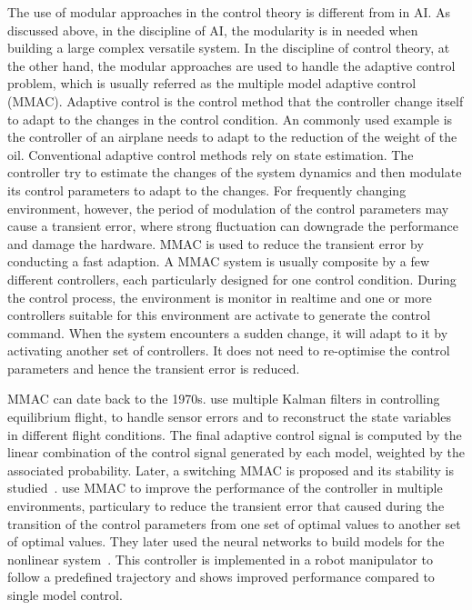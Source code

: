 The use of modular approaches in the control theory is different from in AI. As discussed above, in the discipline of AI, the modularity is in needed when building a large complex versatile system. In the discipline of control theory, at the other hand, the modular approaches are used to handle the adaptive control problem, which is usually referred as the multiple model adaptive control (MMAC).
Adaptive control is the control method that the controller change itself to adapt to the changes in the control condition.
An commonly used example is the controller of an airplane needs to adapt to the reduction of the weight of the oil.
Conventional adaptive control methods rely on state estimation. The controller try to estimate the changes of the system dynamics and then modulate its control parameters to adapt to the changes. For frequently changing environment, however, the period of modulation of the control parameters may cause a transient error, where strong fluctuation can downgrade the performance and damage the hardware. MMAC is used to reduce the transient error by conducting a fast adaption. A MMAC system is usually composite by a few different controllers, each particularly designed for one control condition. During the control process, the environment is monitor in realtime and one or more controllers suitable for this environment are activate to generate the control command. When the system encounters a sudden change, it will adapt to it by activating another set of controllers. It does not need to re-optimise the control parameters and hence the transient error is reduced.

MMAC can date back to the 1970s. \citet{athans1977stochastic} use multiple Kalman filters in controlling equilibrium flight, to handle sensor errors and to reconstruct the state variables in different flight conditions. The final adaptive control signal is computed by the linear combination of the control signal generated by each model, weighted by the associated probability. Later, a switching MMAC is proposed and its stability is studied~\citep{fu1986adaptive}.
\citet{narendra1994improving} use MMAC to improve the performance of the controller in multiple environments, particulary to reduce the transient error that caused during the transition of the control parameters from one set of optimal values to another set of optimal values. They later used the neural networks to build models for the nonlinear system~\citep{narendra1995adaptation,narendra1997adaptive}. This controller is implemented in a robot manipulator to follow a predefined trajectory and shows improved performance compared to single model control.


